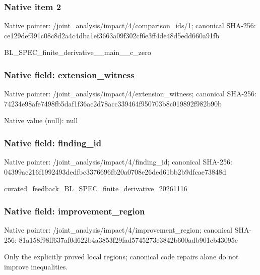 \documentclass[10pt,a4paper]{article}
\begin{document}
\subsubsection{Native item 2}
Native pointer: /joint\_\allowbreak{}analysis/impact/4/comparison\_\allowbreak{}ids/1; canonical SHA-256: ce129def391c08c8d2a4c4dba1ef3663a09f302cf6e3ff4de48d5edd660a91fb

\begingroup\raggedright\sloppy BL\_\allowbreak{}SPEC\_\allowbreak{}finite\_\allowbreak{}derivative\_\allowbreak{}\_\allowbreak{}main\_\allowbreak{}\_\allowbreak{}c\_\allowbreak{}zero\par\endgroup

\subsubsection{Native field: extension\_\allowbreak{}witness}
Native pointer: /joint\_\allowbreak{}analysis/impact/4/extension\_\allowbreak{}witness; canonical SHA-256: 74234e98afe7498fb5daf1f36ac2d78acc339464f950703b8c019892f982b90b

Native value (null): null

\subsubsection{Native field: finding\_\allowbreak{}id}
Native pointer: /joint\_\allowbreak{}analysis/impact/4/finding\_\allowbreak{}id; canonical SHA-256: 04399ac216f1992493dedfbc3376696fb20a0708e26ded61bb2b9dfcae73848d

\begingroup\raggedright\sloppy curated\_\allowbreak{}feedback\_\allowbreak{}BL\_\allowbreak{}SPEC\_\allowbreak{}finite\_\allowbreak{}derivative\_\allowbreak{}20261116\par\endgroup

\subsubsection{Native field: improvement\_\allowbreak{}region}
Native pointer: /joint\_\allowbreak{}analysis/impact/4/improvement\_\allowbreak{}region; canonical SHA-256: 81a158f98ff637af0d622b4a3853f29fad5745273e3842b600adb901cb43095e

\begingroup\raggedright\sloppy Only the explicitly proved local regions;\allowbreak{} canonical code repairs alone do not improve inequalities.\par\endgroup
\end{document}
